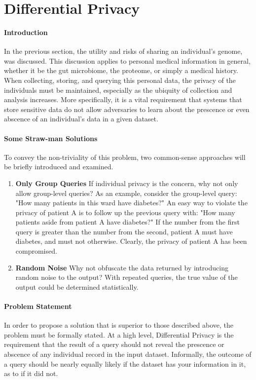 \pagebreak
\section{Differential Privacy}

\paragraph{Introduction}
In the previous section, the utility and risks of sharing an individual's genome, was discussed. This discussion applies to personal medical information in general, whether it be the gut microbiome, the proteome, or simply a medical history. When collecting, storing, and querying this personal data, the privacy of the individuals must be maintained, especially as the ubiquity of collection and analysis increases. More specifically, it is a vital requirement that systems that store sensitive data do not allow adversaries to learn about the prescence or even abscence of an individual's data in a given dataset.

\paragraph{Some Straw-man Solutions}
To convey the non-triviality of this problem, two common-sense approaches will be briefly introduced and examined.

\begin{enumerate}
\item \textbf{Only Group Queries} If individual privacy is the concern, why not only allow group-level queries? As an example, consider the group-level query: "How many patients in this ward have diabetes?" An easy way to violate the privacy of patient A is to follow up the previous query with: "How many patients aside from patient A have diabetes?" If the number from the first query is greater than the number from the second, patient A must have diabetes, and must not otherwise. Clearly, the privacy of patient A has been compromised.
\item \textbf{Random Noise} Why not obfuscate the data returned by introducing random noise to the output? With repeated queries, the true value of the output could be determined statistically.
\end{enumerate}

\paragraph{Problem Statement}
In order to propose a solution that is superior to those described above, the problem must be formally stated. At a high level, Differential Privacy is the requirement that the result of a query should not reveal the prescence or abscence of any individual record in the input dataset. Informally, the outcome of a query should be nearly equally likely if the dataset has your information in it, as to if it did not.

